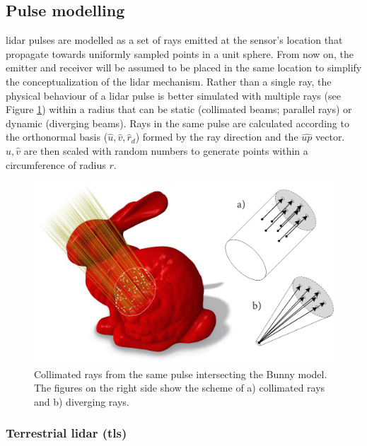 \subsection{Pulse modelling}

\acrshort{lidar} pulses are modelled as a set of rays emitted at the sensor's location that propagate towards uniformly sampled points in a unit sphere. From now on, the emitter and receiver will be assumed to be placed in the same location to simplify the conceptualization of the \acrshort{lidar} mechanism. Rather than a single ray, the physical behaviour of a \acrshort{lidar} pulse is better simulated with multiple rays \cite{zohdi_rapid_2020} (see Figure \ref{fig:pulse_radius_insight}) within a radius that can be static (collimated beams; parallel rays) or dynamic (diverging beams). Rays in the same pulse are calculated according to the orthonormal basis ($\hat{u}, \hat{v}, \hat{r}_{d}$) formed by the ray direction and the $\hat{\textit{up}}$ vector. $\hat{u}, \hat{v}$ are then scaled with random numbers to generate points within a circumference of radius $r$. 

\begin{figure}[ht]
	\centering
	\includegraphics[width=\linewidth]{figs/lidar_simulation/ray_section.png}
	\caption{Collimated rays from the same pulse intersecting the Bunny model. The figures on the right side show the scheme of a) collimated rays and b) diverging rays.}
	\label{fig:pulse_radius_insight}
\end{figure}

\subsubsection{Terrestrial \acrshort{lidar} (\acrshort{tls})}

